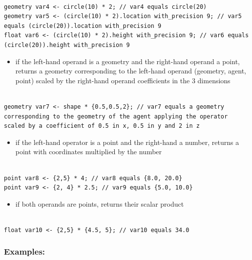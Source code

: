\documentclass[]{book}
\providecommand{\tightlist}{%
  \setlength{\itemsep}{0pt}\setlength{\parskip}{0pt}}
\theoremstyle{definition}
\theoremstyle{definition}
\theoremstyle{definition}
\theoremstyle{remark}
\begin{document}
\begin{verbatim}
 
geometry var4 <- circle(10) * 2; // var4 equals circle(20) 
geometry var5 <- (circle(10) * 2).location with_precision 9; // var5 equals (circle(20)).location with_precision 9 
float var6 <- (circle(10) * 2).height with_precision 9; // var6 equals (circle(20)).height with_precision 9
\end{verbatim}

\begin{itemize}
\tightlist
\item
  if the left-hand operand is a geometry and the right-hand operand a
  point, returns a geometry corresponding to the left-hand operand
  (geometry, agent, point) scaled by the right-hand operand coefficients
  in the 3 dimensions
\end{itemize}

\begin{verbatim}
 
geometry var7 <- shape * {0.5,0.5,2}; // var7 equals a geometry corresponding to the geometry of the agent applying the operator scaled by a coefficient of 0.5 in x, 0.5 in y and 2 in z
\end{verbatim}

\begin{itemize}
\tightlist
\item
  if the left-hand operator is a point and the right-hand a number,
  returns a point with coordinates multiplied by the number
\end{itemize}

\begin{verbatim}
 
point var8 <- {2,5} * 4; // var8 equals {8.0, 20.0} 
point var9 <- {2, 4} * 2.5; // var9 equals {5.0, 10.0}
\end{verbatim}

\begin{itemize}
\tightlist
\item
  if both operands are points, returns their scalar product
\end{itemize}

\begin{verbatim}
 
float var10 <- {2,5} * {4.5, 5}; // var10 equals 34.0
\end{verbatim}

\subsubsection{Examples:}\label{examples-5}
\end{document}
